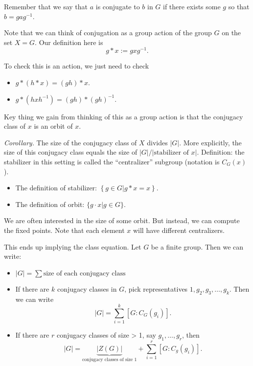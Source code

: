 \documentclass[12pt]{article}
\begin{document}
Remember that we say that $a$ is conjugate to $b$ in $G$ if there exists some $g$ so that $b = g a g^{-1}$.

Note that we can think of conjugation as a group action of the group $G$ on the set $X = G$.  Our definition here is
\[
  g * x := g x g^{-1}.
\]

To check this is an action, we just need to check
\begin{itemize}
  \item $g * (h * x) = (gh) * x$.
  \item $g * (h x h^{-1}) = (gh) * (gh)^{-1}$.
\end{itemize}

Key thing we gain from thinking of this as a group action is that the conjugacy class of $x$ is an orbit of $x$.

{\it Corollary.} The size of the conjugacy class of $X$ divides $|G|$.  More explicitly, the size of this conjugacy class equals the size of $|G| / |\text{stabilizer of $x$}|$.  Definition: the stabilizer in this setting is called the ``centralizer'' subgroup (notation is $C_G(x)$).  

\begin{itemize}
  \item The definition of stabilizer: $\left\{ g \in G | g * x = x \right\}$.
  \item The definition of orbit:  $\{g \cdot x | g \in G\}$.
\end{itemize}

We are often interested in the size of some orbit.  But instead, we can compute the fixed points.  Note that each element $x$ will have different centralizers.

This ends up implying the class equation.  Let $G$ be a finite group.  Then we can write:

\begin{itemize}
  \item $|G| = \sum \text{size of each conjugacy class}$
  \item If there are $k$ conjugacy classes in $G$, pick representatives $1, g_2, g_3, \dots, g_k$.  Then we can write
    \[
      |G| = \sum_{i=1}^{k} [G:C_G(g_i)].
    \]
  \item If there are $r$ conjugacy classes of size > 1, say $g_1, \dots, g_r$, then
    \[
      |G| = \underbrace{|Z(G)|}_{\text{conjugacy classes of size $1$}} + \sum_{i=1}^{r}  [G: C_g(g_i)].
    \]
\end{itemize}
\end{document}
